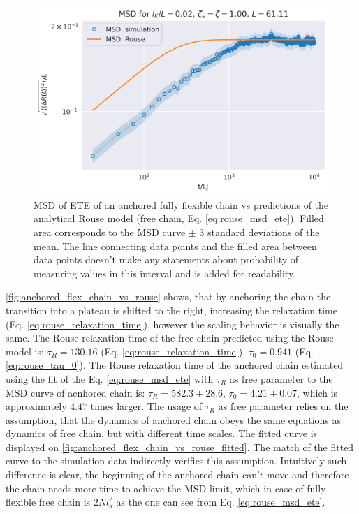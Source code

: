\documentclass[
    paper=A4,pagesize=automedia,fontsize=12pt,
    BCOR=15mm,DIV=22,
    twoside,headinclude,footinclude=false,
    fleqn,             %
    bibliography=totocnumbered,          %
    listof=totoc,                %
    listof=flat,                 %
    cleardoublepage=empty      %
    numbers=endperiod
]{scrartcl}
\begin{document}
\begin{figure}[h]
    \begin{center}
      \includegraphics[width=\columnwidth,trim={0cm 0cm 0cm 0.9cm},clip]{3-exp-fixed-param-log.png}
      \caption{\label{fig:anchored_flex_chain_vs_rouse}
      MSD of ETE of an anchored fully flexible chain vs predictions of
      the analytical Rouse model (free chain, Eq. \ref{eq:rouse_msd_ete}).
      Filled area corresponds to the MSD curve $\pm$ 3 standard deviations of the mean. 
      The
      line connecting data points and the filled area between data points doesn't make
      any statements about probability of measuring values in this interval and is
      added for readability.
      }
    \end{center}
\end{figure}

\autoref{fig:anchored_flex_chain_vs_rouse} shows, that by anchoring the chain
the transition into a plateau is shifted to the right, increasing the 
relaxation time (Eq. \ref{eq:rouse_relaxation_time}), 
however the scaling behavior is visually the same. The Rouse relaxation time
of the free chain predicted using the Rouse model 
is: $\tau_R=130.16$ (Eq. \ref{eq:rouse_relaxation_time}), 
$\tau_0=0.941$ (Eq. \ref{eq:rouse_tau_0}). 
The Rouse relaxation time of the anchored chain estimated 
using the fit of the Eq. \ref{eq:rouse_msd_ete} with $\tau_R$ as free parameter
to the MSD curve of acnhored chain is: 
$\tau_R=582.3 \pm 28.6$, $\tau_0=4.21 \pm 0.07$, which is approximately $4.47$ times
larger. The usage of $\tau_R$ as free parameter relies on the assumption, that
the dynamics of anchored chain obeys the same equations as dynamics of free chain, 
but with different time scales. The fitted curve is displayed on
\autoref{fig:anchored_flex_chain_vs_rouse_fitted}. The match of 
the fitted curve to the simulation data indirectly verifies this assumption.
Intuitively such difference is clear, the beginning of the anchored chain
can't move and therefore the chain needs more time to achieve the MSD limit, which
in case of fully flexible free chain is $2Nl_b^2$ as the one can see from Eq. \ref{eq:rouse_msd_ete}. 
\end{document}
